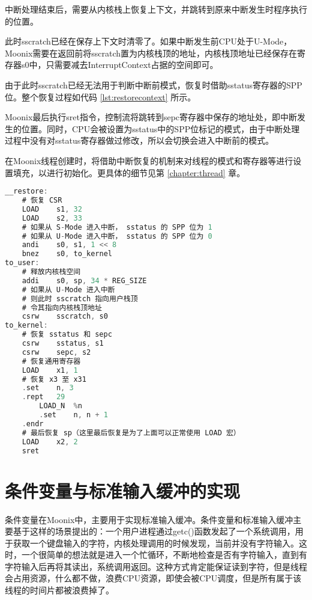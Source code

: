 中断处理结束后，需要从内核栈上恢复上下文，并跳转到原来中断发生时程序执行的位置。

此时sscratch已经在保存上下文时清零了。如果中断发生前CPU处于U-Mode，Moonix需要在返回前将sscratch置为内核栈顶的地址，内核栈顶地址已经保存在寄存器s0中，只需要减去InterruptContext占据的空间即可。

由于此时sscratch已经无法用于判断中断前模式，恢复时借助sstatus寄存器的SPP位。整个恢复过程如代码 \ref{lst:restorecontext} 所示。

Moonix最后执行sret指令，控制流将跳转到sepc寄存器中保存的地址处，即中断发生的位置。同时，CPU会被设置为sstatus中的SPP位标记的模式，由于中断处理过程中没有对sstatus寄存器做过修改，所以会切换会进入中断前的模式。

在Moonix线程创建时，将借助中断恢复的机制来对线程的模式和寄存器等进行设置填充，以进行初始化。更具体的细节见第 \ref{chapter:thread} 章。


\begin{minipage}[c]{0.95\textwidth}
\begin{lstlisting}[language={C}, caption={恢复中断上下文}, label={lst:restorecontext}]
__restore:
	# 恢复 CSR
	LOAD    s1, 32
	LOAD    s2, 33
	# 如果从 S-Mode 进入中断， sstatus 的 SPP 位为 1
	# 如果从 U-Mode 进入中断， sstatus 的 SPP 位为 0
	andi    s0, s1, 1 << 8
	bnez    s0, to_kernel
to_user:
	# 释放内核栈空间
	addi    s0, sp, 34 * REG_SIZE
	# 如果从 U-Mode 进入中断
	# 则此时 sscratch 指向用户栈顶
	# 令其指向内核栈顶地址
	csrw    sscratch, s0
to_kernel:
	# 恢复 sstatus 和 sepc
	csrw    sstatus, s1
	csrw    sepc, s2
	# 恢复通用寄存器
	LOAD    x1, 1
	# 恢复 x3 至 x31
	.set    n, 3
	.rept   29
		LOAD_N  %n
		.set    n, n + 1
	.endr
	# 最后恢复 sp（这里最后恢复是为了上面可以正常使用 LOAD 宏）
	LOAD    x2, 2
	sret
\end{lstlisting}
\end{minipage}

\section{条件变量与标准输入缓冲的实现}
\label{sec:condition}

条件变量在Moonix中，主要用于实现标准输入缓冲。条件变量和标准输入缓冲主要基于这样的场景提出的：一个用户进程通过getc()函数发起了一个系统调用，用于获取一个键盘输入的字符，内核处理调用的时候发现，当前并没有字符输入。这时，一个很简单的想法就是进入一个忙循环，不断地检查是否有字符输入，直到有字符输入后再将其读出，系统调用返回。这种方式肯定能保证读到字符，但是线程会占用资源，什么都不做，浪费CPU资源，即使会被CPU调度，但是所有属于该线程的时间片都被浪费掉了。

